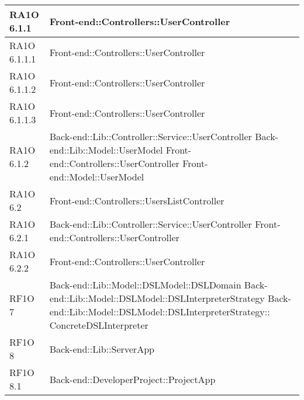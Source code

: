 \begin{center}
\begin{longtable}{ | p{3cm} | p{11cm} | }
    RA1O 6.1.1 & Front-end::Controllers::UserController \newline  \\ \hline     
     
    RA1O 6.1.1.1 & Front-end::Controllers::UserController \newline  \\ \hline
        
    RA1O 6.1.1.2 & Front-end::Controllers::UserController \newline  \\ \hline
        
    RA1O 6.1.1.3 & Front-end::Controllers::UserController \newline  \\ \hline
       
    RA1O 6.1.2 & Back-end::Lib::Controller::Service::UserController \newline Back-end::Lib::Model::UserModel \newline Front-end::Controllers::UserController \newline Front-end::Model::UserModel \newline  \\ \hline     
    
    
    RA1O 6.2 & Front-end::Controllers::UsersListController  \\ \hline     
     
    RA1O 6.2.1 & Back-end::Lib::Controller::Service::UserController \newline Front-end::Controllers::UserController \newline  \\ \hline      
    RA1O 6.2.2 & Front-end::Controllers::UserController \newline  \\ \hline      
      
    RF1O 7 & Back-end::Lib::Model::DSLModel::DSLDomain \newline Back-end::Lib::Model::DSLModel::DSLInterpreterStrategy \newline Back-end::Lib::Model::DSLModel::DSLInterpreterStrategy:: \newline ConcreteDSLInterpreter  \\ \hline      
    
    RF1O 8 & Back-end::Lib::ServerApp \newline  \\ \hline   
       
    RF1O 8.1  & Back-end::DeveloperProject::ProjectApp \newline  \\ \hline  
        

\end{longtable}
\end{center}
